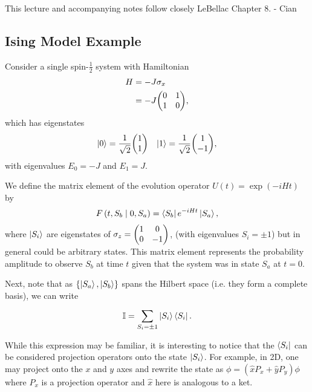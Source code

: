
This lecture and accompanying notes follow closely LeBellac Chapter 8.
- Cian

\subsection{Ising Model Example}

Consider a single spin-$\frac{1}{2}$ system with Hamiltonian
\begin{align*}
    H &= -J \sigma_x \\
      &= -J \mqty( 0 & 1 \\ 1 & 0)
,\end{align*}
which has eigenstates
\begin{align*}
    \ket{0} = \frac{1}{\sqrt{2} } \mqty( 1 \\ 1 ) && \ket{1} = \frac{1}{\sqrt{2} } \mqty( 1 \\ - 1)
,\end{align*}
with eigenvalues $E_0 = -J$ and $E_1 = J$.

\begin{definition}
    We define the matrix element of the evolution operator $U(t) = \exp \left( -i H t \right) $ by
    \begin{align*}
        F\left(t,S_b  \mid 0, S_a  \right) = \bra{S_b} e^{-i H t} \ket{S_a}
    ,\end{align*}
    where $\ket{S_i}$ are eigenstates of $\sigma_z = \mqty( 1 & 0 \\ 0 & -1)$, (with eigenvalues $S_i = \pm 1$) but in general could be arbitrary states. This matrix element represents the probability amplitude to observe $S_b$ at time $t$ given that the system was in state $S_a$ at $t = 0$.
\end{definition}

Next, note that as $\{\ket{S_a}, \ket{S_b}\} $ spans the Hilbert space (i.e. they form a complete basis), we can write
\begin{align*}
    \mathbb{I} = \sum_{S_i=\pm 1}^{} \ket{S_i} \bra{S_i}
.\end{align*}
\begin{note}
    While this expression may be familiar, it is interesting to notice that the $\bra{S_i}$ can be considered projection operators onto the state $\ket{S_i}$. For example, in 2D, one may project onto the $x$ and $y$ axes and rewrite the state as $\phi = \left( \hat{x}P_x + \hat{y} P_y \right) \phi$ where $P_x$ is a projection operator and $\hat{x}$ here is analogous to a ket.
\end{note}

